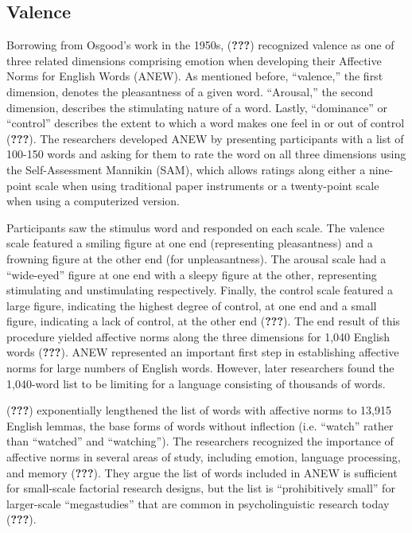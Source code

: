 \documentclass[,man]{apa6}
\theoremstyle{definition}
\theoremstyle{definition}
\theoremstyle{definition}
\theoremstyle{remark}
\begin{document}
\hypertarget{valence}{%
\subsection{Valence}\label{valence}}

Borrowing from Osgood's work in the 1950s, ({\textbf{???}}) recognized
valence as one of three related dimensions comprising emotion when
developing their Affective Norms for English Words (ANEW). As mentioned
before, \enquote{valence,} the first dimension, denotes the pleasantness
of a given word. \enquote{Arousal,} the second dimension, describes the
stimulating nature of a word. Lastly, \enquote{dominance} or
\enquote{control} describes the extent to which a word makes one feel in
or out of control ({\textbf{???}}). The researchers developed ANEW by
presenting participants with a list of 100-150 words and asking for them
to rate the word on all three dimensions using the Self-Assessment
Mannikin (SAM), which allows ratings along either a nine-point scale
when using traditional paper instruments or a twenty-point scale when
using a computerized version.

Participants saw the stimulus word and responded on each scale. The
valence scale featured a smiling figure at one end (representing
pleasantness) and a frowning figure at the other end (for
unpleasantness). The arousal scale had a \enquote{wide-eyed} figure at
one end with a sleepy figure at the other, representing stimulating and
unstimulating respectively. Finally, the control scale featured a large
figure, indicating the highest degree of control, at one end and a small
figure, indicating a lack of control, at the other end ({\textbf{???}}).
The end result of this procedure yielded affective norms along the three
dimensions for 1,040 English words ({\textbf{???}}). ANEW represented an
important first step in establishing affective norms for large numbers
of English words. However, later researchers found the 1,040-word list
to be limiting for a language consisting of thousands of words.

({\textbf{???}}) exponentially lengthened the list of words with
affective norms to 13,915 English lemmas, the base forms of words
without inflection (i.e. \enquote{watch} rather than \enquote{watched}
and \enquote{watching}). The researchers recognized the importance of
affective norms in several areas of study, including emotion, language
processing, and memory ({\textbf{???}}). They argue the list of words
included in ANEW is sufficient for small-scale factorial research
designs, but the list is \enquote{prohibitively small} for larger-scale
\enquote{megastudies} that are common in psycholinguistic research today
({\textbf{???}}).
\end{document}
